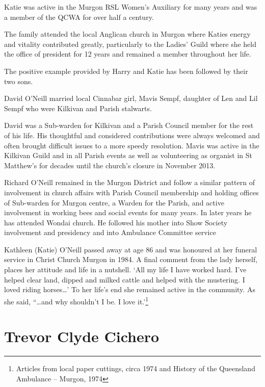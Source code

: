 Katie was active in the Murgon RSL Women's Auxiliary for many years and was a member of the QCWA for over half a century.



The family attended the local Anglican church in Murgon where Katies energy and vitality contributed greatly, particularly to the Ladies' Guild where she held the office of president for 12 years and remained a member throughout her life.



The positive example provided by Harry and Katie has been followed by their two sons.



David O'Neill married local Cinnabar girl, Mavis Sempf, daughter of Len and Lil Sempf who were Kilkivan and Parish stalwarts.



David was a Sub-warden for Kilkivan and a Parish Council member for the rest of his life. His thoughtful and considered contributions were always welcomed and often brought difficult issues to a more speedy resolution. Mavis was active in the Kilkivan Guild and in all Parish events as well as volunteering as organist in St Matthew's for decades until the church's closure in November 2013.



Richard O'Neill remained in the Murgon District and follow a similar pattern of involvement in church affairs with Parish Council membership and holding offices of Sub-warden for Murgon centre, a Warden for the Parish, and active involvement in working bees and social events for many years. In later years he has attended Wondai church. He followed his mother into Show Society involvement and presidency and into Ambulance Committee service



Kathleen (Katie) O'Neill passed away at age 86 and was honoured at her funeral service in Christ Church Murgon in 1984. A final comment from the lady herself, places her attitude and life in a nutshell. `All my life I have worked hard. I've helped clear land, dipped and milked cattle and helped with the mustering. I loved riding horses\ldots' To her life's end she remained active in the community. As she said, ``\ldots and why shouldn't I be. I love it.'\footnote{Articles from local paper cuttings, circa 1974 and History of the Queensland Ambulance -- Murgon, 1974}


\section{Trevor Clyde Cichero}



